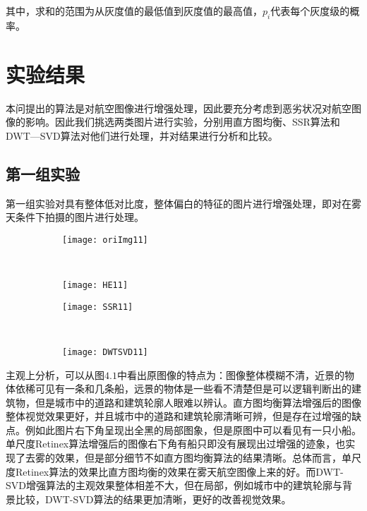 其中，求和的范围为从灰度值的最低值到灰度值的最高值，$p_i$代表每个灰度级的概率。

		\section{实验结果}本问提出的算法是对航空图像进行增强处理，因此要充分考虑到恶劣状况对航空图像的影响。因此我们挑选两类图片进行实验，分别用直方图均衡、SSR算法和DWT—SVD算法对他们进行处理，并对结果进行分析和比较。
			\subsection{第一组实验}第一组实验对具有整体低对比度，整体偏白的特征的图片进行增强处理，即对在雾天条件下拍摄的图片进行处理。

\begin{figure}[!htbp]
    \centering
    \begin{subfigure}[b]{0.35\textwidth}
      \texttt{[image: oriImg11]}
      \caption{}
      \label{fig:oaspl_a}
    \end{subfigure}%
    ~%
    \begin{subfigure}[b]{0.35\textwidth}
      \texttt{[image: HE11]}
      \caption{}
      \label{fig:oaspl_b}
    \end{subfigure}
    \begin{subfigure}[b]{0.35\textwidth}
      \texttt{[image: SSR11]}
      \caption{}
      \label{fig:oaspl_c}
    \end{subfigure}%
    ~%
    \begin{subfigure}[b]{0.35\textwidth}
      \texttt{[image: DWTSVD11]}
      \caption{}
      \label{fig:oaspl_d}
    \end{subfigure}
    \label{fig:oaspl}
\end{figure}

主观上分析，可以从图$4.1$中看出原图像的特点为：图像整体模糊不清，近景的物体依稀可见有一条和几条船，远景的物体是一些看不清楚但是可以逻辑判断出的建筑物，但是城市中的道路和建筑轮廓人眼难以辨认。直方图均衡算法增强后的图像整体视觉效果更好，并且城市中的道路和建筑轮廓清晰可辨，但是存在过增强的缺点。例如此图片右下角呈现出全黑的局部图象，但是原图中可以看见有一只小船。单尺度Retinex算法增强后的图像右下角有船只即没有展现出过增强的迹象，也实现了去雾的效果，但是部分细节不如直方图均衡算法的结果清晰。总体而言，单尺度Retinex算法的效果比直方图均衡的效果在雾天航空图像上来的好。而DWT-SVD增强算法的主观效果整体相差不大，但在局部，例如城市中的建筑轮廓与背景比较，DWT-SVD算法的结果更加清晰，更好的改善视觉效果。

